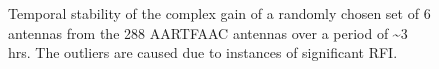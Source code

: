 \documentclass[referee]{aa}
\begin{document}
\begin{figure}[tbh]
\caption{\label{fig:gain-Temporal-stability}Temporal  stability  of the  complex
  gain of  a randomly chosen  set of 6  antennas from the 288  AARTFAAC antennas
  over  a  period  of \textasciitilde3  hrs.  The  outliers  are caused  due  to
  instances of significant RFI.}
\end{figure}
\end{document}
